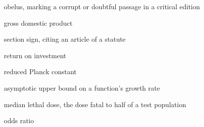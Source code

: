 
%
%

\begin{denotation}[3cm]

\item[$\dagger$]{
  obelus, marking a corrupt or doubtful passage in a critical edition
}

\item[GDP]{
  gross domestic product
}

\item[\S]{
  section sign, citing an article of a statute
}

\item[ROI]{
  return on investment
}

\item[$\hbar$]{
  reduced Planck constant
}

\item[$O(\cdot)$]{
  asymptotic upper bound on a function's growth rate
}

\item[$\mathrm{LD}_{50}$]{
  median lethal dose, the dose fatal to half of a test population
}

\item[OR]{
  odds ratio
}

\end{denotation}
